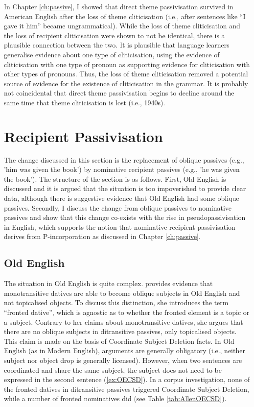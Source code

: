 	In Chapter \ref{ch:passive}, I showed that direct theme passivisation survived in American English after the loss of theme cliticisation (i.e., after sentences like ``I gave it him'' became ungrammatical). While the loss of theme cliticisation and the loss of recipient cliticisation were shown to not be identical, there is a plausible connection between the two. It is plausible that language learners generalise evidence about one type of cliticisation, using the evidence of cliticisation with one type of pronoun as supporting evidence for cliticisation with other types of pronouns. Thus, the loss of theme cliticisation removed a potential source of evidence for the existence of cliticisation in the grammar. It is probably not coincidental that direct theme passivisation begins to decline around the same time that theme cliticisation is lost (i.e., 1940s).
 
	\section{Recipient Passivisation}\label{sec:en-pas}

	The change discussed in this section is the replacement of oblique passives (e.g., 'him was given the book') by nominative recipient passives (e.g., 'he was given the book'). The structure of the section is as follows. First, Old English is discussed and it is argued that the situation is too impoverished to provide clear data, although there is suggestive evidence that Old English had some oblique passives. Secondly, I discuss the change from oblique passives to nominative passives and show that this change co-exists with the rise in pseudopassivisation in English, which supports the notion that nominative recipient passivisation derives from P-incorporation as discussed in Chapter \ref{ch:passive}. 

\subsection{Old English}
	The situation in Old English is quite complex. \cite{Allen.1999} provides evidence that monotransitive datives are able to become oblique subjects in Old English and not topicalised objects. To discuss this distinction, she introduces the term ``fronted dative'', which is agnostic as to whether the fronted element is a topic or a subject. Contrary to her claims about monotransitive datives, she argues that there are no oblique subjects in ditransitive passives, only topicalised objects. This claim is made on the basis of Coordinate Subject Deletion facts. In Old English (as in Modern English), arguments are generally obligatory (i.e., neither subject nor object drop is generally licensed). However, when two sentences are coordinated and share the same subject, the subject does not need to be expressed in the second sentence (\ref{ex:OECSD}). In a corpus investigation, none of the fronted datives in ditransitive passives triggered Coordinate Subject Deletion, while a number of fronted nominatives did (see Table \ref{tab:AllenOECSD}). 


